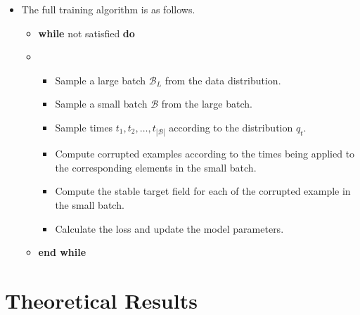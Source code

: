 \documentclass[10pt]{article}
\newcommand{\mcal}[1]{\mathcal{#1}}
\begin{document}
\begin{itemize}
  \item The full training algorithm is as follows.
  \begin{itemize}
    \item[] {\bf while} not satisfied {\bf do}
    \item[] \begin{itemize}
      \item[] Sample a large batch $\mcal{B}_L$ from the data distribution.
      \item[] Sample a small batch $\mcal{B}$ from the large batch.
      \item[] Sample times $t_1, t_2, \dotsc, t_{|\mcal{B}|}$ according to the distribution $q_t$.
      \item[] Compute corrupted examples according to the times being applied to the corresponding elements in the small batch.
      \item[] Compute the stable target field for each of the corrupted example in the small batch.
      \item[] Calculate the loss and update the model parameters.
    \end{itemize}
    \item[] {\bf end while}
  \end{itemize}  
\end{itemize}

\section{Theoretical Results}
\end{document}
